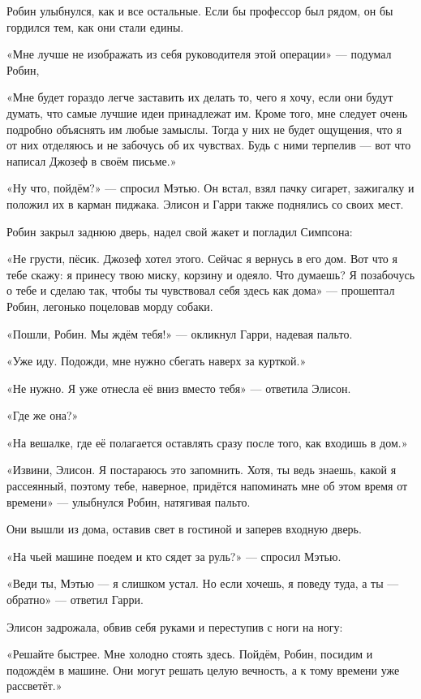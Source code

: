 \documentclass[a5paper, 9pt,
final, openany, twoside=true]{memoir}
\begin{document}
Робин улыбнулся, как и все остальные. Если бы профессор был рядом, он бы гордился тем, как они стали едины.

«Мне лучше не изображать из себя руководителя этой операции» — подумал Робин,

«Мне будет гораздо легче заставить их делать то, чего я хочу, если они будут думать, что самые лучшие идеи принадлежат им. Кроме того, мне следует очень подробно объяснять им любые замыслы. Тогда у них не будет ощущения, что я от них отделяюсь и не забочусь об их чувствах. Будь с ними терпелив — вот что написал Джозеф в своём письме.»

«Ну что, пойдём?» — спросил Мэтью. Он встал, взял пачку сигарет, зажигалку и положил их в карман пиджака. Элисон и Гарри также поднялись со своих мест.\bigskip

Робин закрыл заднюю дверь, надел свой жакет и погладил Симпсона:

«Не грусти, пёсик. Джозеф хотел этого. Сейчас я вернусь в его дом. Вот что я тебе скажу: я принесу твою миску, корзину и одеяло. Что думаешь? Я позабочусь о тебе и сделаю так, чтобы ты чувствовал себя здесь как дома» — прошептал Робин, легонько поцеловав морду собаки.

«Пошли, Робин. Мы ждём тебя!» — окликнул Гарри, надевая пальто.

«Уже иду. Подожди, мне нужно сбегать наверх за курткой.»

«Не нужно. Я уже отнесла её вниз вместо тебя» — ответила Элисон.

«Где же она?»

«На вешалке, где её полагается оставлять сразу после того, как входишь в дом.»

«Извини, Элисон. Я постараюсь это запомнить. Хотя, ты ведь знаешь, какой я рассеянный, поэтому тебе, наверное, придётся напоминать мне об этом время от времени» — улыбнулся Робин, натягивая пальто.

Они вышли из дома, оставив свет в гостиной и заперев входную дверь.

«На чьей машине поедем и кто сядет за руль?» — спросил Мэтью.

«Веди ты, Мэтью — я слишком устал. Но если хочешь, я поведу туда, а ты — обратно» — ответил Гарри.

Элисон задрожала, обвив себя руками и переступив с ноги на ногу:

«Решайте быстрее. Мне холодно стоять здесь. Пойдём, Робин, посидим и подождём в машине. Они могут решать целую вечность, а к тому времени уже рассветёт.»
\end{document}
